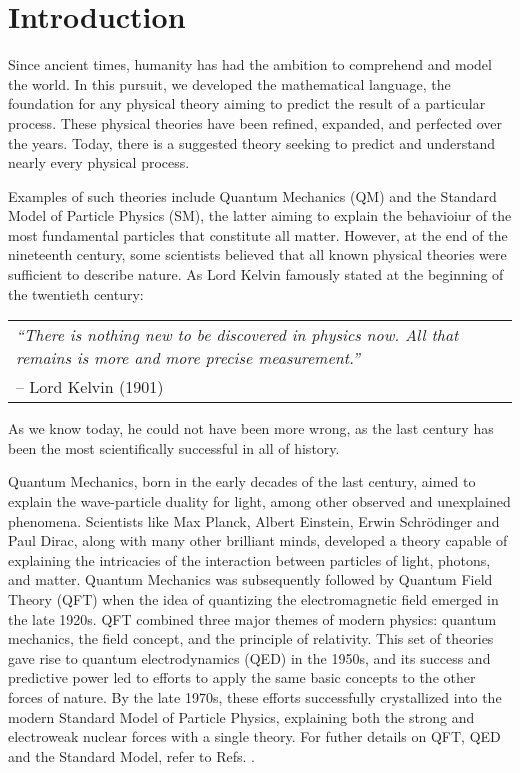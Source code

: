 \chapter*{Introduction}

Since ancient times, humanity has had the ambition to comprehend and model the world. In this pursuit, we developed the mathematical language, the foundation for any physical theory aiming to predict the result of a particular process. These physical theories have been refined, expanded, and perfected over the years. Today, there is a suggested theory seeking to predict and understand nearly every physical process.

Examples of such theories include Quantum Mechanics (QM) and the Standard Model of Particle Physics (SM), the latter aiming to explain the behavioiur of the most fundamental particles that constitute all matter. However, at the end of the nineteenth century, some scientists believed that all known physical theories were sufficient to describe nature. As Lord Kelvin famously stated at the beginning of the twentieth century:
\begin{center}
    \begin{tabular}{p{12cm}}
        \emph{``There is nothing new to be discovered in physics now. All that remains is more and more precise measurement.''}\\
        \hfill{}-- Lord Kelvin (1901)\\
    \end{tabular}
\end{center}
As we know today, he could not have been more wrong, as the last century has been the most scientifically successful in all of history.

Quantum Mechanics, born in the early decades of the last century, aimed to explain the wave-particle duality for light, among other observed and unexplained phenomena. Scientists like Max Planck, Albert Einstein, Erwin Schrödinger and Paul Dirac, along with many other brilliant minds, developed a theory capable of explaining the intricacies of the interaction between particles of light, photons, and matter. Quantum Mechanics was subsequently followed by Quantum Field Theory (QFT) when the idea of quantizing the electromagnetic field emerged in the late 1920s. QFT combined three major themes of modern physics: quantum mechanics, the field concept, and the principle of relativity. This set of theories gave rise to quantum electrodynamics (QED) in the 1950s, and its success and predictive power led to efforts to apply the same basic concepts to the other forces of nature. By the late 1970s, these efforts successfully crystallized into the modern Standard Model of Particle Physics, explaining both the strong and electroweak nuclear forces with a single theory. For futher details on QFT, QED and the Standard Model, refer to Refs. \cite{Perkins:1982xb, Peskin:1995ev, Schwartz:2014sze}.

